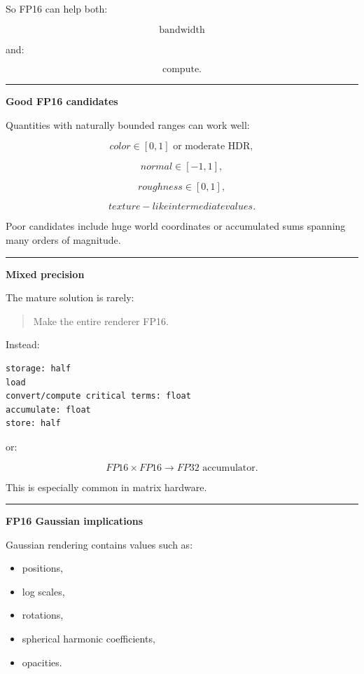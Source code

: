 So FP16 can help both:

\[
\text{bandwidth}
\]

and:

\[
\text{compute}.
\]

\begin{center}\rule{0.5\linewidth}{0.5pt}\end{center}

\textbf{Good FP16 candidates}

Quantities with naturally bounded ranges can work well:

\[
color\in[0,1]\text{ or moderate HDR},
\]

\[
normal\in[-1,1],
\]

\[
roughness\in[0,1],
\]

\[
texture-like intermediate values.
\]

Poor candidates include huge world coordinates or accumulated sums spanning many orders of magnitude.

\begin{center}\rule{0.5\linewidth}{0.5pt}\end{center}

\textbf{Mixed precision}

The mature solution is rarely:

\begin{quote}
Make the entire renderer FP16.
\end{quote}

Instead:

\protect{}\label{p10-mixed}%
\begin{verbatim}
storage: half
load
convert/compute critical terms: float
accumulate: float
store: half
\end{verbatim}

or:

\[
FP16\times FP16
\rightarrow
FP32\text{ accumulator}.
\]

This is especially common in matrix hardware.

\begin{center}\rule{0.5\linewidth}{0.5pt}\end{center}

\textbf{FP16 Gaussian implications}

Gaussian rendering contains values such as:

\begin{itemize}
\tightlist
\item
  positions,
\item
  log scales,
\item
  rotations,
\item
  spherical harmonic coefficients,
\item
  opacities.
\end{itemize}

